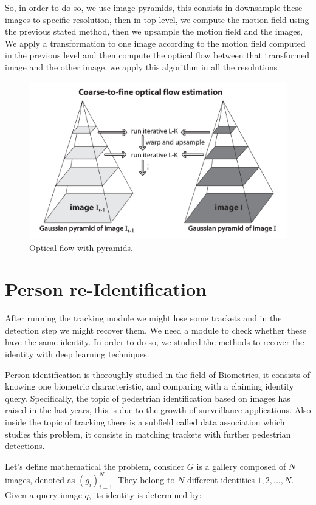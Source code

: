 So, in order to do so, we use image pyramids, this consists in downsample these images to specific resolution, then in top level, we compute the motion field using the previous stated method, then 
we upsample the motion field and the images, We apply a transformation to one image according to the motion field computed in the previous level and then compute the optical flow between that 
transformed image and the other image, we apply this algorithm in all the resolutions



\begin{figure}[H]
\centering         
\includegraphics[width=0.6\linewidth]{lucasKanade/piram.png}
\caption{Optical flow with pyramids.} \label{corner}
\end{figure}





\section{Person re-Identification}\label{misMatch}


After running the tracking module we might lose some trackets and in the detection step we might recover them. We need a module to check whether these have the same identity. In order to do so, we studied the methods to recover the identity with deep learning techniques.

Person identification is thoroughly studied in the field of Biometrics, it consists of  knowing one biometric characteristic, and comparing with a claiming identity query. Specifically, the topic of pedestrian identification based on images has raised in the last years, this is due to the growth of surveillance applications. Also inside the topic of tracking there is a subfield called data association which studies this problem, it consists in matching trackets with further pedestrian detections.

Let's define mathematical the problem, consider $G$ is a gallery composed of $N$ images, denoted as $(g_{i})_{i=1}^{N}$. They belong to $N$ different identities $ 1,2,...,N $. Given a query image $q$, its identity is determined by:

